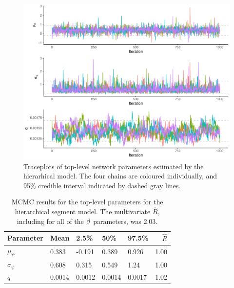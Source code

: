 \begin{knitrout}\small
{}\color{fgcolor}\begin{figure}

{\centering \includegraphics[width=\textwidth]{figure/nw_model_n2_diag-1} 

}

\caption[Traceplots of top-level network parameters estimated by the hierarhical model]{Traceplots of top-level network parameters estimated by the hierarhical model. The four chains are coloured individually, and 95\% credible interval indicated by dashed gray lines.}\label{fig:nw_model_n2_diag}
\end{figure}


\end{knitrout}


\begin{table}

\caption{\label{tab:nw_model_n2_smry}MCMC results for the top-level parameters for the hierarchical segment model. The multivariate $\hat R$, including for all of the $\beta$ parameters, was 2.03.}
\centering
\begin{tabular}[b]{lllllr}
\toprule
Parameter & Mean & 2.5\% & 50\% & 97.5\% & $\hat R$\\
\midrule
$\mu_\psi$ & 0.383 & -0.191 & 0.389 & 0.926 & 1.00\\
$\sigma_\psi$ & 0.608 & 0.315 & 0.549 & 1.24 & 1.00\\
$q$ & 0.0014 & 0.0012 & 0.0014 & 0.0017 & 1.02\\
\bottomrule
\end{tabular}
\end{table}




